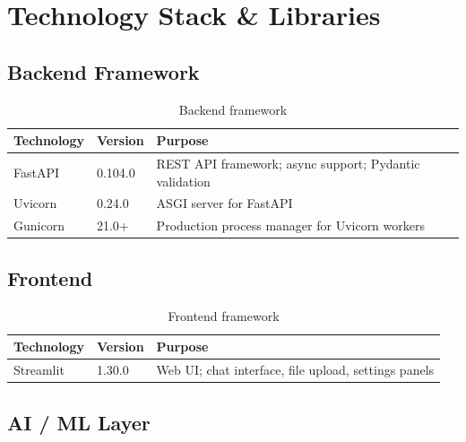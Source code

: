 \documentclass[12pt, a4paper, oneside]{report}
\begin{document}
\chapter{Technology Stack \& Libraries}

\section{Backend Framework}

\begin{table}[H]
\centering
{}
\begin{tabularx}{\linewidth}{llX}
\toprule
\rowcolor{rapidblue!10}
\textbf{Technology} & \textbf{Version} & \textbf{Purpose} \\
\midrule
FastAPI & 0.104.0 & REST API framework; async support; Pydantic validation \\
Uvicorn & 0.24.0 & ASGI server for FastAPI \\
Gunicorn & 21.0+ & Production process manager for Uvicorn workers \\
\bottomrule
\end{tabularx}
\caption{Backend framework}
\end{table}

\section{Frontend}

\begin{table}[H]
\centering
{}
\begin{tabularx}{\linewidth}{llX}
\toprule
\rowcolor{rapidblue!10}
\textbf{Technology} & \textbf{Version} & \textbf{Purpose} \\
\midrule
Streamlit & 1.30.0 & Web UI; chat interface, file upload, settings panels \\
\bottomrule
\end{tabularx}
\caption{Frontend framework}
\end{table}

\section{AI / ML Layer}
\end{document}
